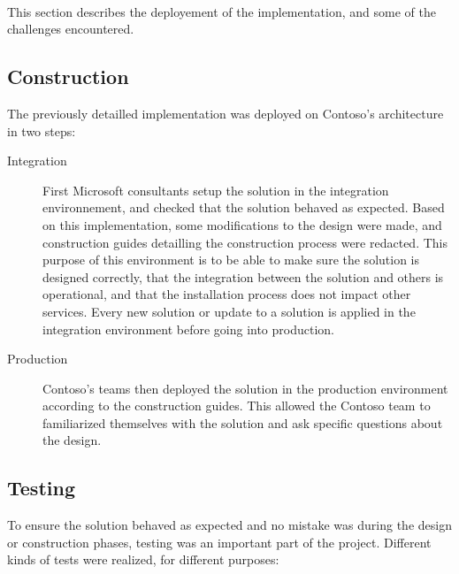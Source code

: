 \paragraph{}
This section describes the deployement of the implementation, and some of the challenges encountered.

\subsection{Construction}
	The previously detailled implementation was deployed on Contoso's architecture in two steps: 
	\begin{description}
		\item[Integration] First Microsoft consultants setup the solution in the integration environnement, and checked that the solution behaved as expected. Based on this implementation, some modifications to the design were made, and construction guides detailling the construction process were redacted. This purpose of this environment is to be able to make sure the solution is designed correctly, that the integration between the solution and others is operational, and that the installation process does not impact other services. Every new solution or update to a solution is applied in the integration environment before going into production. 
		
		\item[Production] Contoso's teams then deployed the solution in the production environment according to the construction guides. This allowed the Contoso team to familiarized themselves with the solution and ask specific questions about the design.
	\end{description}


\subsection{Testing}
	To ensure the solution behaved as expected and no mistake was during the design or construction phases, testing was an important part of the project. Different kinds of tests were realized, for different purposes:
	
